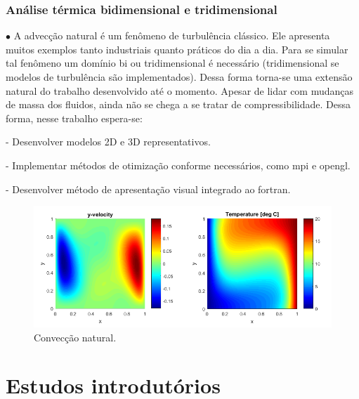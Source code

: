 \documentclass[xcolor=dvipsnames,10pt,aspectratio=169]{beamer}
\begin{document}
	\begin{frame}
		\frametitle{Análise térmica bidimensional e tridimensional}
		$\bullet$ A advecção natural é um fenômeno de turbulência clássico. Ele apresenta muitos exemplos tanto industriais quanto práticos do dia a dia. 
		Para se simular tal fenômeno um domínio bi ou tridimensional é necessário (tridimensional se modelos de turbulência são implementados). Dessa forma torna-se uma extensão natural do trabalho desenvolvido até o momento. Apesar de lidar com mudanças de massa dos fluidos, ainda não se chega a se tratar de compressibilidade. Dessa forma, nesse trabalho espera-se:

		- Desenvolver modelos 2D e 3D representativos.

		- Implementar métodos de otimização conforme necessários, como mpi e opengl.

		- Desenvolver método de apresentação visual integrado ao fortran. 

		\begin{figure}[h!]
			\centering
			\includegraphics[trim = {1.7cm 2cm 0 1cm}, clip , angle=0, scale=0.50]{images/NaturalConvectionFromNet}
			\caption{Convecção natural.}
		\end{figure}

	\end{frame}
	
\section{Estudos introdutórios}

	
	
\end{document}

